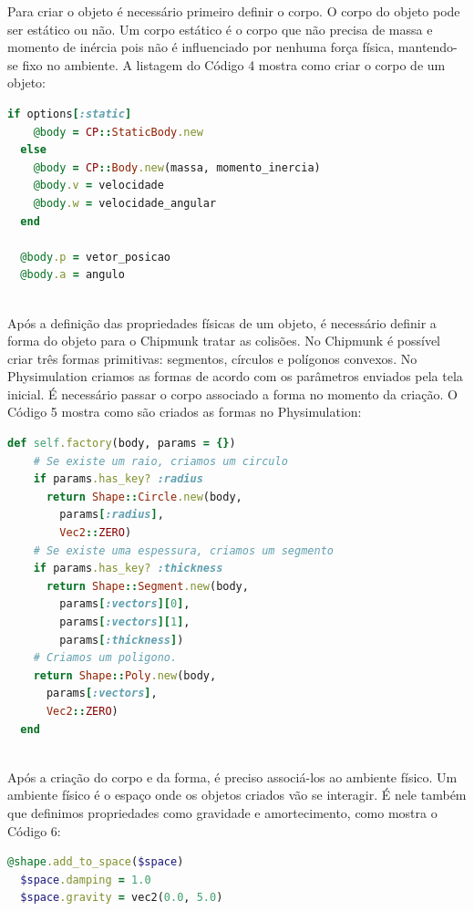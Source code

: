 Para criar o objeto é necessário primeiro definir o corpo. O corpo do objeto pode ser estático ou não. Um corpo estático é o corpo que não precisa de
massa e momento de inércia pois não é influenciado por nenhuma força física, mantendo-se fixo no ambiente. A listagem do Código 4 mostra como criar o corpo de um objeto:

\begin{lstlisting}[language=Ruby, caption=physics.rb]
  if options[:static]
    @body = CP::StaticBody.new
  else
    @body = CP::Body.new(massa, momento_inercia)
    @body.v = velocidade
    @body.w = velocidade_angular
  end

  @body.p = vetor_posicao
  @body.a = angulo
\end{lstlisting} 

\ \\
\hspace*{14pt} Após a definição das propriedades físicas de um objeto, é necessário definir a forma do objeto para o Chipmunk tratar as colisões. No Chipmunk é 
possível criar três formas primitivas: segmentos, círculos e polígonos convexos. No Physimulation criamos as formas de acordo com os parâmetros enviados
pela tela inicial. É necessário passar o corpo associado a forma no momento da criação. O Código 5 mostra como são criados as formas no Physimulation:

\newpage

\begin{lstlisting}[language=Ruby, caption=physics.rb]
  def self.factory(body, params = {})
    # Se existe um raio, criamos um circulo
    if params.has_key? :radius
      return Shape::Circle.new(body, 
        params[:radius], 
        Vec2::ZERO)
    # Se existe uma espessura, criamos um segmento
    if params.has_key? :thickness
      return Shape::Segment.new(body, 
        params[:vectors][0], 
        params[:vectors][1], 
        params[:thickness])
    # Criamos um poligono.
    return Shape::Poly.new(body, 
      params[:vectors], 
      Vec2::ZERO)
  end
\end{lstlisting} 

\ \\
\hspace*{14pt} Após a criação do corpo e da forma, é preciso associá-los ao ambiente físico. Um ambiente físico é o espaço onde os objetos criados vão se interagir. É 
nele também que definimos propriedades como gravidade e amortecimento, como mostra o Código 6:

\begin{lstlisting}[language=Ruby, caption=physics.rb]
  @shape.add_to_space($space)
  $space.damping = 1.0
  $space.gravity = vec2(0.0, 5.0)
\end{lstlisting}

